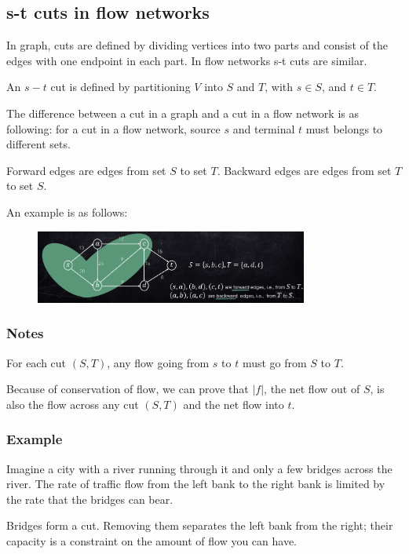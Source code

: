 \subsection{s-t cuts in flow networks}

In graph, cuts are defined by dividing vertices into two parts and consist of the edges with one endpoint in each part. In flow networks s-t cuts are similar.

\begin{definition}
	An $s - t$ cut is defined by partitioning $V$ into $S$ and $T$, with $s \in S$, and $t \in T$.
\end{definition}

The difference between a cut in a graph and a cut in a flow network is as following: for a cut in a flow network, source $s$ and terminal $t$ must belongs to different sets.

\begin{definition}
	Forward edges are edges from set $S$ to set $T$. Backward edges are edges from set $T$ to set $S$.
\end{definition}
An example is as follows:
\begin{figure}[H]
	\centering
	\includegraphics[width=0.8\textwidth]{fig/cut.png}
\end{figure}
\subsubsection{Notes}
For each cut $(S, T)$, any flow going from $s$ to $t$ must go from $S$ to $T$.

Because of conservation of flow, we can prove that $|f|$, the net flow out of $S$, is also the flow across any cut $(S, T)$ and the net flow into $t$.
\subsubsection{Example}
Imagine a city with a river running through it and only a few bridges across the river. The rate of traffic flow from the left bank to the right bank is limited by the rate that the bridges can bear.

Bridges form a cut. Removing them separates the left bank from the right; their capacity is a constraint on the amount of flow you can have.
